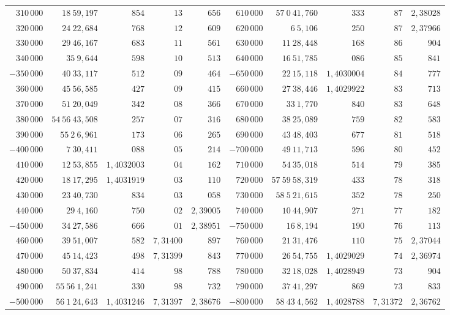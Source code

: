 \begin{center}
\begin{tabular}{|r|r|r|r|r||r|r|r|r|r|}
$310\,000$&$18\ 59{,}197$&$854$&$13$&$656$&$610\,000$&$57\ 0\ 41{,}760$&$333$&$87$&$2{,}38028$\\
$320\,000$&$24\ 22{,}684$&$768$&$12$&$609$&$620\,000$&$6\ 5{,}106$&$250$&$87$&$2{,}37966$\\
$330\,000$&$29\ 46{,}167$&$683$&$11$&$561$&$630\,000$&$11\ 28{,}448$&$168$&$86$&$904$\\
$340\,000$&$35\ 9{,}644$&$598$&$10$&$513$&$640\,000$&$16\ 51{,}785$&$086$&$85$&$841$\\
\hline
$-350\,000$&$40\ 33{,}117$&$512$&$09$&$464$&$-650\,000$&$22\ 15{,}118$&$1{,}4030004$&$84$&$777$\\
$360\,000$&$45\ 56{,}585$&$427$&$09$&$415$&$660\,000$&$27\ 38{,}446$&$1{,}4029922$&$83$&$713$\\
$370\,000$&$51\ 20{,}049$&$342$&$08$&$366$&$670\,000$&$33\ 1{,}770$&$840$&$83$&$648$\\
$380\,000$&$54\ 56\ 43{,}508$&$257$&$07$&$316$&$680\,000$&$38\ 25{,}089$&$759$&$82$&$583$\\
$390\,000$&$55\ 2\ 6{,}961$&$173$&$06$&$265$&$690\,000$&$43\ 48{,}403$&$677$&$81$&$518$\\
\hline
$-400\,000$&$7\ 30{,}411$&$088$&$05$&$214$&$-700\,000$&$49\ 11{,}713$&$596$&$80$&$452$\\
$410\,000$&$12\ 53{,}855$&$1{,}4032003$&$04$&$162$&$710\,000$&$54\ 35{,}018$&$514$&$79$&$385$\\
$420\,000$&$18\ 17{,}295$&$1{,}4031919$&$03$&$110$&$720\,000$&$57\ 59\ 58{,}319$&$433$&$78$&$318$\\
$430\,000$&$23\ 40{,}730$&$834$&$03$&$058$&$730\,000$&$58\ 5\ 21{,}615$&$352$&$78$&$250$\\
$440\,000$&$29\ 4{,}160$&$750$&$02$&$2{,}39005$&$740\,000$&$10\ 44{,}907$&$271$&$77$&$182$\\
\hline
$-450\,000$&$34\ 27{,}586$&$666$&$01$&$2{,}38951$&$-750\,000$&$16\ 8{,}194$&$190$&$76$&$113$\\
$460\,000$&$39\ 51{,}007$&$582$&$7{,}31400$&$897$&$760\,000$&$21\ 31{,}476$&$110$&$75$&$2{,}37044$\\
$470\,000$&$45\ 14{,}423$&$498$&$7{,}31399$&$843$&$770\,000$&$26\ 54{,}755$&$1{,}4029029$&$74$&$2{,}36974$\\
$480\,000$&$50\ 37{,}834$&$414$&$98$&$788$&$780\,000$&$32\ 18{,}028$&$1{,}4028949$&$73$&$904$\\
$490\,000$&$55\ 56\ 1{,}241$&$330$&$98$&$732$&$790\,000$&$37\ 41{,}297$&$869$&$73$&$833$\\
\hline
$-500\,000$&$56\ 1\ 24{,}643$&$1{,}4031246$&$7{,}31397$&$2{,}38676$&$-800\,000$&$58\ 43\ 4{,}562$&$1{,}4028788$&$7{,}31372$&$2{,}36762$\\
\end{tabular}\par\endgroup
\end{center}
